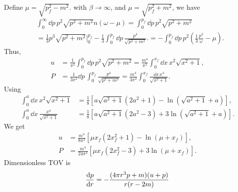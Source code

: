 Define $\mu = \sqrt{p_f^2 - m^2}$.
with $\beta \rightarrow \infty$, and $\mu = \sqrt{p_f^2 + m^2}$, we have
%
\begin{align}
    &\int_0^\infty \dd p \, p^2  \sqrt{p^2 + m^2} n(\omega - \mu)
    =
    \int_0^{p_f} \dd p \, p^2 \sqrt{p^2 + m^2}\\
    & = \frac{1}{3} p^3 \sqrt{p^2 + m^2 }\bigg|_0^{p_f} 
    - \frac{1}{3}\int_0^{p_f} \dd p \, \frac{p^4}{\sqrt{p^2 + m^2}}.
    =
    -
    \int_0^{p_f}
    \dd p \, p^2
    \left(
        \frac{1}{3}
        \frac{p^2}{\omega}
        - \mu
    \right).
\end{align}
%
Thus,
%
\begin{align}
    u &= \frac{1}{\pi^2} \int_0^{p_f} \dd p \,
    p^2 \sqrt{p^2 + m^2}
    = \frac{m^4}{\pi^2} \int_0^{x_f} \dd x \, x^2 \sqrt{x^2 + 1}, \\
    P & = \frac{1}{3 \pi^2} \dd p \, \int_0^{p_f}\frac{p^4}{\sqrt{p^2 + m^2}} 
    = \frac{m^4}{3 \pi^2} \int_0^{x_f} \frac{\dd x \, x^4}{\sqrt{x^2 + 1}}.
\end{align}
%
Using 
%
\begin{align}
    \int_0^a \dd x \, x^2 \sqrt{x^2 + 1} 
    & = \frac{1}{8} 
    \left[a \sqrt{a^2 + 1}(2 a^2 + 1) - \ln\left(\sqrt{a^2 + 1} + a\right)\right], \\
    \int_0^a \dd x \, \frac{x^4}{\sqrt{x^2 + 1} }
    & = \frac{1}{8} 
    \left[a \sqrt{a^2 + 1}(2 a^2 - 3) + 3\ln\left(\sqrt{a^2 + 1} + a\right)\right].
\end{align}
%
We get 
%
\begin{align}
    u &= \frac{m^4}{8 \pi^2} 
    \left[\mu x_f (2x_f^2 + 1) - \ln\left(\mu + x_f\right)\right], \\
    P &= \frac{m^4}{24 \pi^2} 
    \left[\mu x_f (2x_f^2 -3) + 3\ln\left(\mu + x_f\right)\right].
\end{align}
%
Dimensionless TOV is
%
\begin{equation}
    \diff{p}{r} = - \frac{(4 \pi r^3 p + m)(u + p)}{r(r - 2 m)}
\end{equation}